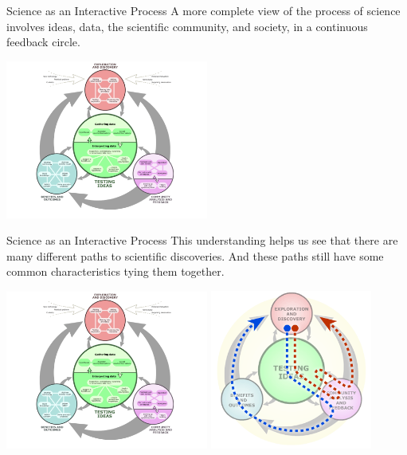\begin{frame}{Science as an Interactive Process}{}
  A more complete view of the process of science involves ideas, data, the scientific community, and society, in a continuous feedback circle.
  \begin{center}
    \includegraphics[width=0.5\textwidth]{../img/understandingscience_realprocess1}
  \end{center}
\end{frame}

\begin{frame}{Science as an Interactive Process}{}
  This understanding helps us see that there are many different paths to scientific discoveries. And these paths still have some common characteristics tying them together.
  \begin{center}
    \includegraphics[width=0.5\textwidth]{../img/understandingscience_realprocess1}
    \includegraphics[width=0.4\textwidth]{../img/understandingscience_realprocess2}
  \end{center}
\end{frame}


